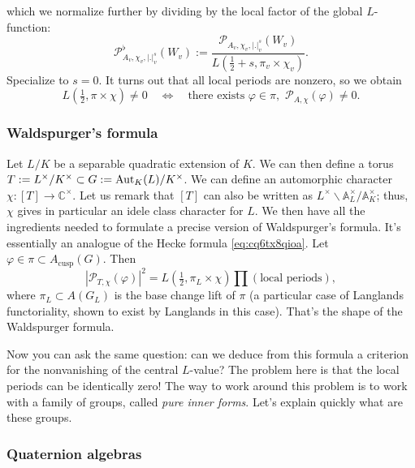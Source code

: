 \documentclass[reqno]{amsart} 
\numberwithin{theorem}{section}
\numberwithin{equation}{section}
\numberwithin{exercise}{section}
\begin{document}
which we normalize further by dividing by the local factor of the global $L$-function:
\begin{equation*}
  \mathcal{P}_{A_v, \chi_v, \lvert . \rvert_v^s}^\flat(W_v) :=
  \frac{\mathcal{P}_{A_v, \chi_v, \lvert . \rvert_v^s}(W_v)}{L(\tfrac{1}{2} + s, \pi_v \times \chi_v)}.
\end{equation*}
Specialize to $s = 0$.  It turns out that all local periods are nonzero, so we obtain
\begin{equation*}
  L(\tfrac{1}{2}, \pi \times \chi) \neq 0
  \quad \iff \quad
  \text{there exists } \varphi \in \pi, \, \, \mathcal{P}_{A, \chi}(\varphi) \neq 0.
\end{equation*}

\subsubsection{Waldspurger's formula}\label{sec:cq6tyama80}

Let $L /K$ be a separable quadratic extension of $K$.  We can then define a torus $T := L^\times / K^\times \subset G := \operatorname{Aut}_K(L) / K^\times$.  We can define an automorphic character $\chi :[T] \rightarrow \mathbb{C}^\times$.  Let us remark that $[T]$ can also be written as $L^\times \backslash \mathbb{A}_L^\times / \mathbb{A}_K^\times$; thus, $\chi$ gives in particular an idele class character for $L$.  We then have all the ingredients needed to formulate a precise version of Waldspurger's formula.  It's essentially an analogue of the Hecke formula \eqref{eq:cq6tx8qioa}.  Let $\varphi \in \pi \subset A_{\mathrm{cusp}}(G)$.  Then
\begin{equation*}
  \left\lvert \mathcal{P}_{T, \chi}(\varphi) \right\rvert^2
  =
  L(\tfrac{1}{2}, \pi_L \times \chi) \prod(\text{local periods}),
\end{equation*}
where $\pi_L \subset A(G_L)$ is the base change lift of $\pi$ (a particular case of Langlands functoriality, shown to exist by Langlands in this case).  That's the shape of the Waldspurger formula.

Now you can ask the same question: can we deduce from this formula a criterion for the nonvanishing of the central $L$-value?  The problem here is that the local periods can be identically zero!  The way to work around this problem is to work with a family of groups, called \emph{pure inner forms}.  Let's explain quickly what are these groups.

\subsubsection{Quaternion algebras}\label{sec:cq6tyamby0}
\end{document}
